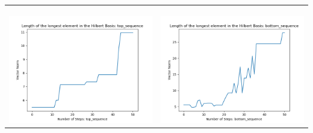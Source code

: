 \documentclass[10pt]{article}
\begin{document}
\begin{tabular}{c|c}
\begin{minipage}{.45\textwidth}
\end{minipage} \\ \\
\hline \\
\begin{minipage}{.45\textwidth}
\includegraphics[width=\textwidth]{"DATA/5d/6 generators 2 bound F alternating/top_sequence LENGTH"}
\end{minipage} &
\begin{minipage}{.45\textwidth}
\includegraphics[width=\textwidth]{"DATA/5d/6 generators 2 bound F alternating/bottom_sequence LENGTH"}
\end{minipage}
\end{tabular}
\end{document}
